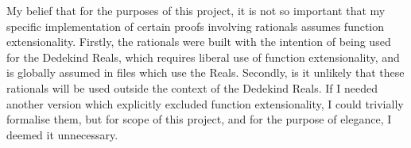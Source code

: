\documentclass[ProjectReport]{subfiles}
\begin{document}
My belief that for the purposes of this project, it is not so important that my specific implementation of certain proofs involving rationals assumes function extensionality. Firstly, the rationals were built with the intention of being used for the Dedekind Reals, which requires liberal use of function extensionality, and is globally assumed in files which use the Reals. Secondly, is it unlikely that these rationals will be used outside the context of the Dedekind Reals. If I needed another version which explicitly excluded function extensionality, I could trivially formalise them, but for scope of this project, and for the purpose of elegance, I deemed it unnecessary.
\end{document}
